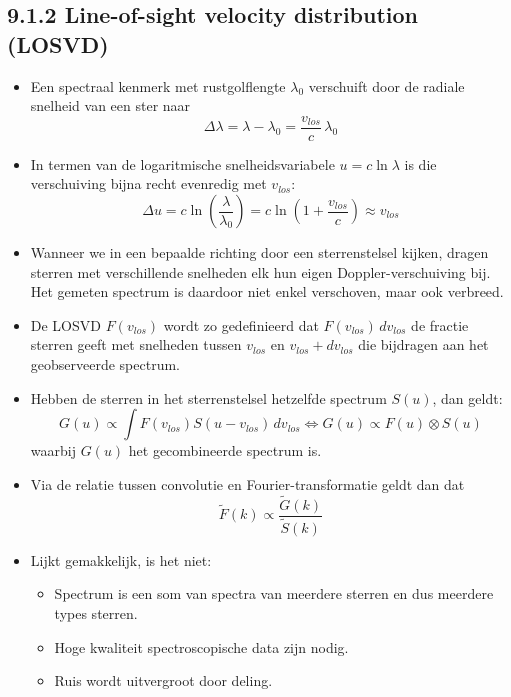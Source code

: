 \documentclass[10pt,a4paper]{article}
\renewenvironment{equation}{\begin{equation*}}{\end{equation*}}
\begin{document}
\subsection*{9.1.2 Line-of-sight velocity distribution (LOSVD)}
\begin{itemize}
  \item Een spectraal kenmerk met rustgolflengte $\lambda_0$ verschuift door de radiale snelheid van een ster naar
  \begin{equation}
    \Delta\lambda = \lambda-\lambda_0 = \frac{v_{los}}{c}\,\lambda_0
    \tag{9.1}
  \end{equation}
  \item In termen van de logaritmische snelheidsvariabele $u=c\ln\lambda$ is die verschuiving bijna recht evenredig met $v_{los}$:
  \begin{equation}
    \Delta u = c\ln\left(\frac{\lambda}{\lambda_0}\right)
    = c\ln\left(1+\frac{v_{los}}{c}\right)
    \approx v_{los}
    \tag{9.2}
  \end{equation}
  \item Wanneer we in een bepaalde richting door een sterrenstelsel kijken, dragen sterren met verschillende snelheden elk hun eigen Doppler-verschuiving bij. Het gemeten spectrum is daardoor niet enkel verschoven, maar ook verbreed.
  \item De LOSVD $F(v_{los})$ wordt zo gedefinieerd dat $F(v_{los})\,dv_{los}$ de fractie sterren geeft met snelheden tussen $v_{los}$ en $v_{los}+dv_{los}$ die bijdragen aan het geobserveerde spectrum.
  \item Hebben de sterren in het sterrenstelsel hetzelfde spectrum $S(u)$, dan geldt:
  \begin{equation}
    G(u)\propto \int F(v_{los})S(u-v_{los})\,dv_{los}
    \Leftrightarrow G(u)\propto F(u)\otimes S(u)
    \tag{9.3}
  \end{equation}
  waarbij $G(u)$ het gecombineerde spectrum is.
  \item Via de relatie tussen convolutie en Fourier-transformatie geldt dan dat
  \begin{equation}
    \tilde{F}(k)\propto \frac{\tilde{G}(k)}{\tilde{S}(k)}
    \tag{9.4}
  \end{equation}
  \item Lijkt gemakkelijk, is het niet:
    \begin{itemize}
      \item Spectrum is een som van spectra van meerdere sterren en dus meerdere types sterren.
      \item Hoge kwaliteit spectroscopische data zijn nodig.
      \item Ruis wordt uitvergroot door deling.
    \end{itemize}
\end{itemize}
\end{document}
